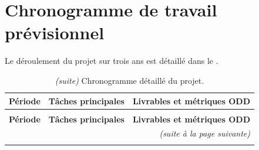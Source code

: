 \documentclass[12pt, a4paper]{article}
\begin{document}
\section{Chronogramme de travail prévisionnel}

Le déroulement du projet sur trois ans est détaillé dans le .

\begin{longtable}{@{}lp{}p{}@{}}
    \caption{Chronogramme détaillé du projet.} \label{tab_timeline} \\

    \toprule
    \textbf{Période} & \textbf{Tâches principales} & \textbf{Livrables et métriques ODD} \\ 
    \midrule
    \endfirsthead
    
    \caption[]{\textit{(suite)} Chronogramme détaillé du projet.} \\
    \toprule
    \textbf{Période} & \textbf{Tâches principales} & \textbf{Livrables et métriques ODD} \\ 
    \midrule
    \endhead
    
    \midrule \multicolumn{3}{r}{\textit{(suite à la page suivante)}} \\ 
    \endfoot
    
    \bottomrule
    \endlastfoot
    

\end{longtable}
\end{document}
